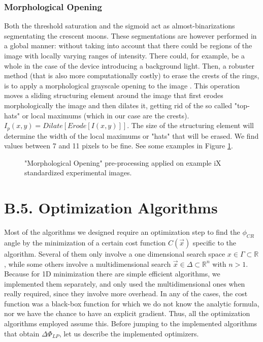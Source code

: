 \documentclass[11pt, a4paper, twoside]{article} %
\newcommand{\R}{\mathbb{R}} %
\begin{document}
\subsubsection*{Morphological Opening}
Both the threshold saturation and the sigmoid act as almost-binarizations segmentating the crescent moons. These segmentations are however performed in a global manner: without taking into account that there could be regions of the image with locally varying ranges of intensity. There could, for example, be a whole in the case of the device introducing a background light. Then, a robuster method (that is also more computationally costly) to erase the crests of the rings, is to apply a morphological grayscale opening to the image \cite{opening}. This operation moves a sliding structuring element around the image that first erodes morphologically the image and then dilates it, getting rid of the so called "top-hats" or local maximums (which in our case are the crests). $I_p(x,y)=Dilate[Erode[I(x,y)]]$. The size of the structuring element will determine the width of the local maximums or "hats" that will be erased. We find values between 7 and 11 pixels to be fine. See some examples in Figure \ref{fig:preprocessingOpening}.

\begin{figure}[h!] 
     \centering 
    \caption{"Morphological Opening" pre-processing applied on example iX standardized experimental images.}
    \label{fig:preprocessingOpening}
\end{figure}

\section*{B.5. Optimization Algorithms}
Most of the algorithms we designed require an optimization step to find the $\phi_{CR}$ angle by  the minimization of a certain cost function $C(\vec{x})$ specific to the algorithm. Several of them only involve a one dimensional search space $x\in\Gamma\subset\R$, while some others involve a multidimensional search $\vec{x}\in\Delta\subset \R^n$ with $n>1$. Because for 1D minimization there are simple efficient algorithms, we implemented them separately, and only used the multidimensional ones when really required, since they involve more overhead. In any of the cases, the cost function was a black-box function for which we do not know the analytic formula, nor we have the chance to have an explicit gradient. Thus, all the optimization algorithms employed assume this. Before jumping to the implemented algorithms that obtain $\Delta\Phi_{LP}$, let us describe the implemented optimizers.
\end{document}
